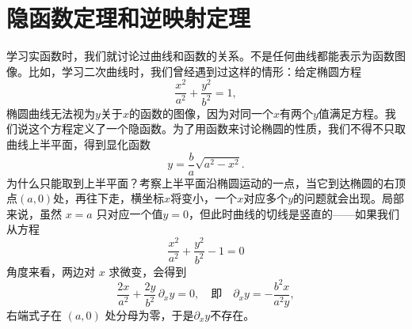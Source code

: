 \documentclass[12pt,UTF8]{ctexbook}
\begin{document}


\section{隐函数定理和逆映射定理}

学习实函数时，我们就讨论过曲线和函数的关系。不是任何曲线都能表示为函数图像。比如，学习二次曲线时，我们曾经遇到过这样的情形：给定椭圆方程
\[
\frac{x^2}{a^2}+\frac{y^2}{b^2}=1,
\]
椭圆曲线无法视为$y$关于$x$的函数的图像，因为对同一个$x$有两个$y$值满足方程。我们说这个方程定义了一个隐函数。为了用函数来讨论椭圆的性质，我们不得不只取曲线上半平面，得到显化函数
\[
y = \frac{b}{a}\sqrt{a^2-x^2}.
\]
为什么只能取到上半平面？考察上半平面沿椭圆运动的一点，当它到达椭圆的右顶点$(a,0)$处，再往下走，横坐标$x$将变小，一个$x$对应多个$y$的问题就会出现。局部来说，虽然 $x=a$ 只对应一个值$y=0$，但此时曲线的切线是竖直的——如果我们从方程
\[
\frac{x^2}{a^2}+\frac{y^2}{b^2}-1=0
\]
角度来看，两边对 $x$ 求微变，会得到
\[
\frac{2x}{a^2}+\frac{2y}{b^2}\,\partial_x y =0,\quad\mbox{即}\quad \partial_x y = -\frac{b^2 x}{a^2 y},
\]
右端式子在 $(a,0)$ 处分母为零，于是$\partial_x y$不存在。
\end{document}
